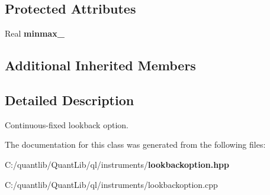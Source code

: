 \subsection*{Protected Attributes}
\begin{DoxyCompactItemize}
\item 
Real {\bfseries minmax\+\_\+}\label{class_quant_lib_1_1_continuous_fixed_lookback_option_a7eba5a2538ba77fdccefbfcd3521225e}

\end{DoxyCompactItemize}
\subsection*{Additional Inherited Members}


\subsection{Detailed Description}
Continuous-\/fixed lookback option. 



The documentation for this class was generated from the following files\+:\begin{DoxyCompactItemize}
\item 
C\+:/quantlib/\+Quant\+Lib/ql/instruments/{\bf lookbackoption.\+hpp}\item 
C\+:/quantlib/\+Quant\+Lib/ql/instruments/lookbackoption.\+cpp\end{DoxyCompactItemize}
